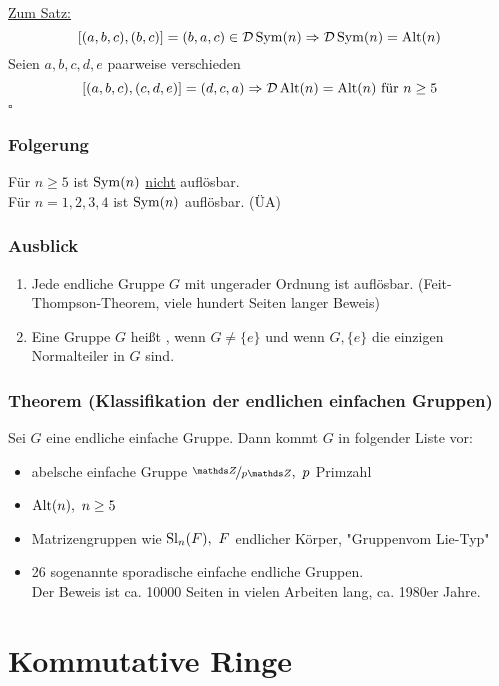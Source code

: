 \uline{Zum Satz:} 
\[
[(a,b,c),(b,c)]=(b,a,c)\in \mathcal{D} \operatorname{Sym}(n)\Rightarrow \mathcal{D}\operatorname{Sym}(n)=\operatorname{Alt}(n)
\]
Seien $a,b,c,d,e$ paarweise verschieden
\[
[(a,b,c),(c,d,e)]=(d,c,a)\Rightarrow \mathcal{D} \operatorname{Alt}(n)=\operatorname{Alt}(n)\text{ für }n\ge 5
\]
\hfill $\square$

\subsubsection*{Folgerung}
Für $n\ge 5$ ist $\operatorname{Sym}(n)$ \uline{nicht} auflösbar.\\
Für $n=1,2,3,4$ ist $\operatorname{Sym}(n)$ auflösbar. (ÜA)

\subsubsection*{Ausblick}
\begin{enumerate}[(1)]
	\item Jede endliche Gruppe $G$ mit ungerader Ordnung ist auflösbar. (Feit-Thompson-Theorem, viele hundert Seiten langer Beweis)
	\item Eine Gruppe $G$ heißt , wenn $G\neq \{e\}$ und wenn $G,\{e\}$ die einzigen Normalteiler in $G$ sind.
\end{enumerate}

\subsubsection*{Theorem (Klassifikation der endlichen einfachen Gruppen)}
Sei $G$ eine endliche einfache Gruppe. Dann kommt $G$ in folgender Liste vor:
\begin{itemize}
	\item abelsche einfache Gruppe $\nicefrac{\Z}{p\Z},~p$ Primzahl
	\item $\operatorname{Alt}(n),~n\ge 5$
	\item Matrizengruppen wie $\operatorname{Sl}_n(F),~F$ endlicher Körper, "Gruppenvom Lie-Typ"
	\item 26 sogenannte sporadische einfache endliche Gruppen.\\
	Der Beweis ist ca. 10000 Seiten in vielen Arbeiten lang, ca. 1980er Jahre.
\end{itemize} 
\newpage

\section{Kommutative Ringe}
\label{sec:komm_ringe}
